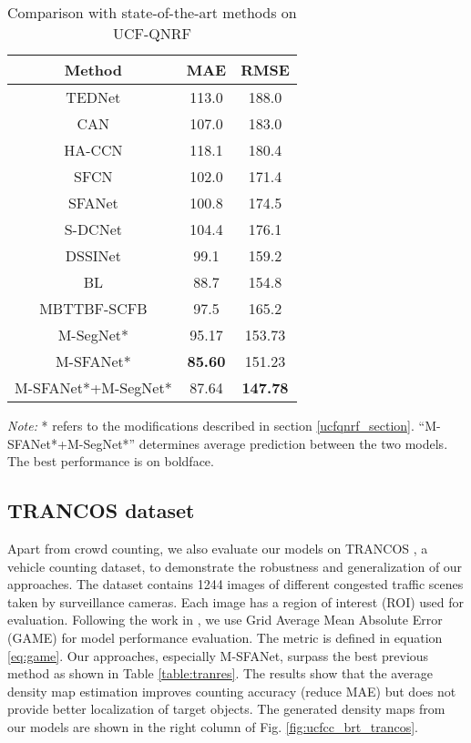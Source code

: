 \documentclass[10pt, conference, a4paper]{IEEEtran}
\begin{document}
\setlength{\tabcolsep}{4pt}
\begin{table}
\begin{center}
\caption{Comparison with state-of-the-art methods on UCF-QNRF \cite{idrees2018composition}}
\begin{tabular}{c|c|c}
\hline
Method & MAE & RMSE\\
\hline
TEDNet \cite{jiang2019crowd} & 113.0 & 188.0\\
CAN \cite{liu2019context} & 107.0 & 183.0\\
HA-CCN \cite{sindagi2019ha} & 118.1 & 180.4\\
SFCN \cite{wang2019learning} & 102.0 & 171.4\\
SFANet \cite{zhu2019dual} & 100.8 & 174.5\\
S-DCNet \cite{xiong2019open} & 104.4 & 176.1\\
DSSINet \cite{liu2019crowd} & 99.1 & 159.2\\
BL \cite{ma2019bayesian} & 88.7 & 154.8\\
MBTTBF-SCFB \cite{sindagi2019multi} & 97.5 & 165.2\\
\hline
M-SegNet* & 95.17 & 153.73\\
M-SFANet* & \textbf{85.60} & 151.23\\
M-SFANet*+M-SegNet* & 87.64 & \textbf{147.78}\\
\hline
\end{tabular}
\label{table:ucfqnrf}
\end{center}
\footnotesize\emph{Note:} * refers to the modifications described in section \ref{ucfqnrf_section}. ``M-SFANet*+M-SegNet*'' determines average prediction between the two models. The best performance is on boldface.
\end{table}
\setlength{\tabcolsep}{1.4pt} 
\subsection{TRANCOS dataset}
Apart from crowd counting, we also evaluate our models on TRANCOS \cite{guerrero2015extremely}, a vehicle counting dataset, to demonstrate the robustness and generalization of our approaches. The dataset contains 1244 images of different congested traffic scenes taken by surveillance cameras. Each image has a region of interest (ROI) used for evaluation. Following the work in \cite{guerrero2015extremely}, we use Grid Average Mean Absolute Error (GAME) for model performance evaluation. The metric is defined in equation \ref{eq:game}. Our approaches, especially M-SFANet, surpass the best previous method as shown in Table \ref{table:tranres}. The results show that the average density map estimation improves counting accuracy (reduce MAE) but does not provide better localization of target objects. The generated density maps from our models are shown in the right column of Fig. \ref{fig:ucfcc_brt_trancos}.
\end{document}
